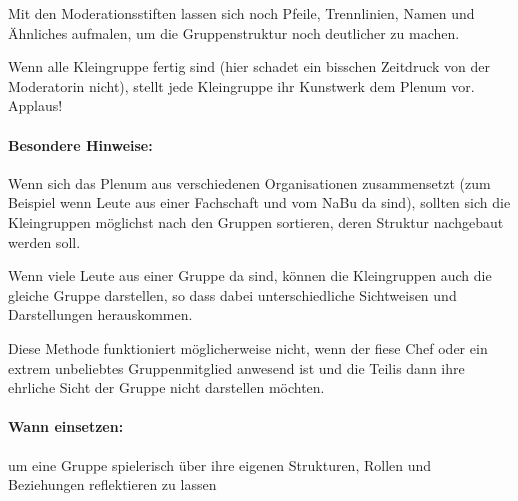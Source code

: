 Mit den Moderationsstiften lassen sich noch Pfeile, Trennlinien, Namen und Ähnliches aufmalen, um die Gruppenstruktur noch deutlicher zu machen.

Wenn alle Kleingruppe fertig sind (hier schadet ein bisschen Zeitdruck von der Moderatorin nicht), stellt jede Kleingruppe ihr Kunstwerk dem Plenum vor. Applaus!
\paragraph{Besondere Hinweise:} Wenn sich das Plenum aus verschiedenen Organisationen zusammensetzt (zum Beispiel wenn Leute aus einer Fachschaft und vom NaBu da sind), sollten sich die Kleingruppen möglichst nach den Gruppen sortieren, deren Struktur nachgebaut werden soll.

Wenn viele Leute aus einer Gruppe da sind, können die Kleingruppen auch die gleiche Gruppe darstellen, so dass dabei unterschiedliche Sichtweisen und Darstellungen herauskommen.

Diese Methode funktioniert möglicherweise nicht, wenn der fiese Chef oder ein extrem unbeliebtes Gruppenmitglied anwesend ist und die Teilis dann ihre ehrliche Sicht der Gruppe nicht darstellen möchten.
\paragraph{Wann einsetzen:} um eine Gruppe spielerisch über ihre eigenen Strukturen, Rollen und Beziehungen reflektieren zu lassen

